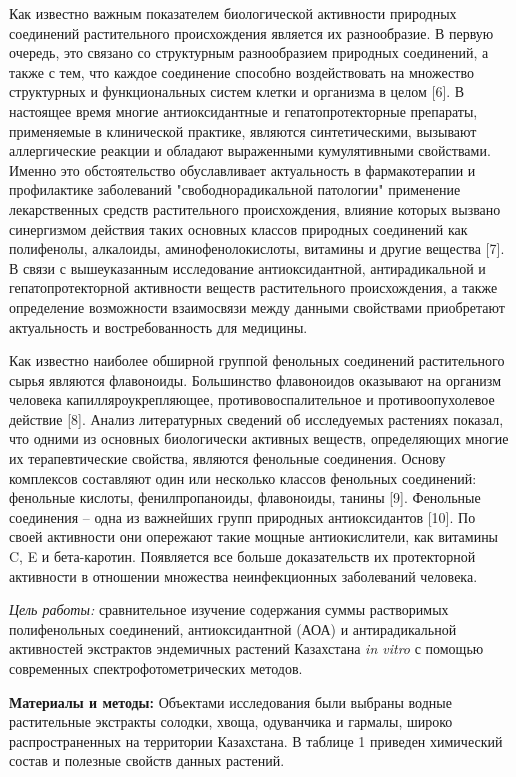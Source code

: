 \begin{multicols}{2}
Как известно важным показателем биологической активности природных
соединений растительного происхождения является их разнообразие. В
первую очередь, это связано со структурным разнообразием природных
соединений, а также с тем, что каждое соединение способно воздействовать
на множество структурных и функциональных систем клетки и организма в
целом {[}6{]}. В настоящее время многие антиоксидантные и
гепатопротекторные препараты, применяемые в клинической практике,
являются синтетическими, вызывают аллергические реакции и обладают
выраженными кумулятивными свойствами. Именно это обстоятельство
обуславливает актуальность в фармакотерапии и профилактике заболеваний
"свободнорадикальной патологии" применение лекарственных средств
растительного происхождения, влияние которых вызвано синергизмом
действия таких основных классов природных соединений как полифенолы,
алкалоиды, аминофенолокислоты, витамины и другие вещества {[}7{]}. В
связи с вышеуказанным исследование антиоксидантной, антирадикальной и
гепатопротекторной активности веществ растительного происхождения, а
также определение возможности взаимосвязи между данными свойствами
приобретают актуальность и востребованность для медицины.

Как известно наиболее обширной группой фенольных соединений
растительного сырья являются флавоноиды. Большинство флавоноидов
оказывают на организм человека капилляроукрепляющее,
противовоспалительное и противоопухолевое действие {[}8{]}. Анализ
литературных сведений об исследуемых растениях показал, что одними из
основных биологически активных веществ, определяющих многие их
терапевтические свойства, являются фенольные соединения. Основу
комплексов составляют один или несколько классов фенольных соединений:
фенольные кислоты, фенилпропаноиды, флавоноиды, танины {[}9{]}.
Фенольные соединения -- одна из важнейших групп природных антиоксидантов
{[}10{]}. По своей активности они опережают такие мощные антиокислители,
как витамины C, E и бета-каротин. Появляется все больше доказательств их
протекторной активности в отношении множества неинфекционных заболеваний
человека.

\emph{Цель работы:} сравнительное изучение содержания суммы растворимых
полифенольных соединений, антиоксидантной (АОА) и антирадикальной
активностей экстрактов эндемичных растений Казахстана \emph{in vitro} с
помощью современных спектрофотометрических методов.

{\bfseries Материалы и методы:} Объектами исследования были выбраны водные
растительные экстракты солодки, хвоща, одуванчика и гармалы, широко
распространенных на территории Казахстана. В таблице 1 приведен
химический состав и полезные свойств данных растений.
\end{multicols}

